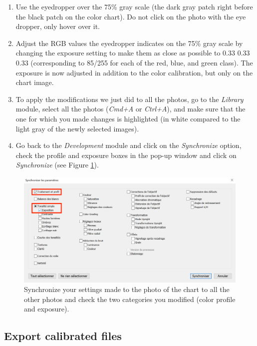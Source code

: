 \documentclass[
]{book}
\begin{document}
\begin{enumerate}
\def\labelenumi{\arabic{enumi}.}
\setcounter{enumi}{4}
\item
  Use the eyedropper over the 75\% gray scale (the dark gray patch right before the
  black patch on the color chart). Do not click on the photo with
  the eye dropper, only hover over it.
\item
  Adjust the RGB values the eyedropper indicates on the 75\% gray scale by changing the
  exposure setting to make them as close as possible to 0.33 0.33 0.33
  (corresponding to 85/255 for each of the red, blue, and green
  class). The exposure is now adjusted in addition to the color
  calibration, but only on the chart image.
\item
  To apply the modifications we just did to all the photos, go to the \emph{Library}
  module, select all the photos (\emph{Cmd+A} or \emph{Ctrl+A}), and make sure that the one
  for which you made changes is highlighted (in white compared to the light gray
  of the newly selected images).
\item
  Go back to the \emph{Development} module and click on the \emph{Synchronize} option, check the profile and exposure boxes in
  the pop-up window and click on \emph{Synchronize} (see Figure \ref{fig:synchronize}).
\end{enumerate}

\begin{figure}

{\centering \includegraphics[width=0.8\linewidth]{Figures/synchronize_capture} 

}

\caption{Synchronize your settings made to the photo of the chart to all the other photos and check the two categories you modified (color profile and exposure).}\label{fig:synchronize}
\end{figure}

\hypertarget{export-calibrated-files}{%
\subsection{Export calibrated files}\label{export-calibrated-files}}
\end{document}
